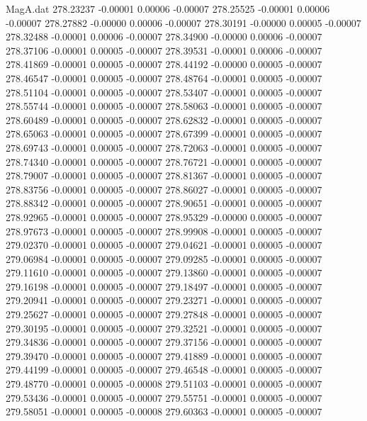 \begin{filecontents}{MagA.dat}
 278.23237   -0.00001    0.00006   -0.00007
 278.25525   -0.00001    0.00006   -0.00007
 278.27882   -0.00000    0.00006   -0.00007
 278.30191   -0.00000    0.00005   -0.00007
 278.32488   -0.00001    0.00006   -0.00007
 278.34900   -0.00000    0.00006   -0.00007
 278.37106   -0.00001    0.00005   -0.00007
 278.39531   -0.00001    0.00006   -0.00007
 278.41869   -0.00001    0.00005   -0.00007
 278.44192   -0.00000    0.00005   -0.00007
 278.46547   -0.00001    0.00005   -0.00007
 278.48764   -0.00001    0.00005   -0.00007
 278.51104   -0.00001    0.00005   -0.00007
 278.53407   -0.00001    0.00005   -0.00007
 278.55744   -0.00001    0.00005   -0.00007
 278.58063   -0.00001    0.00005   -0.00007
 278.60489   -0.00001    0.00005   -0.00007
 278.62832   -0.00001    0.00005   -0.00007
 278.65063   -0.00001    0.00005   -0.00007
 278.67399   -0.00001    0.00005   -0.00007
 278.69743   -0.00001    0.00005   -0.00007
 278.72063   -0.00001    0.00005   -0.00007
 278.74340   -0.00001    0.00005   -0.00007
 278.76721   -0.00001    0.00005   -0.00007
 278.79007   -0.00001    0.00005   -0.00007
 278.81367   -0.00001    0.00005   -0.00007
 278.83756   -0.00001    0.00005   -0.00007
 278.86027   -0.00001    0.00005   -0.00007
 278.88342   -0.00001    0.00005   -0.00007
 278.90651   -0.00001    0.00005   -0.00007
 278.92965   -0.00001    0.00005   -0.00007
 278.95329   -0.00000    0.00005   -0.00007
 278.97673   -0.00001    0.00005   -0.00007
 278.99908   -0.00001    0.00005   -0.00007
 279.02370   -0.00001    0.00005   -0.00007
 279.04621   -0.00001    0.00005   -0.00007
 279.06984   -0.00001    0.00005   -0.00007
 279.09285   -0.00001    0.00005   -0.00007
 279.11610   -0.00001    0.00005   -0.00007
 279.13860   -0.00001    0.00005   -0.00007
 279.16198   -0.00001    0.00005   -0.00007
 279.18497   -0.00001    0.00005   -0.00007
 279.20941   -0.00001    0.00005   -0.00007
 279.23271   -0.00001    0.00005   -0.00007
 279.25627   -0.00001    0.00005   -0.00007
 279.27848   -0.00001    0.00005   -0.00007
 279.30195   -0.00001    0.00005   -0.00007
 279.32521   -0.00001    0.00005   -0.00007
 279.34836   -0.00001    0.00005   -0.00007
 279.37156   -0.00001    0.00005   -0.00007
 279.39470   -0.00001    0.00005   -0.00007
 279.41889   -0.00001    0.00005   -0.00007
 279.44199   -0.00001    0.00005   -0.00007
 279.46548   -0.00001    0.00005   -0.00007
 279.48770   -0.00001    0.00005   -0.00008
 279.51103   -0.00001    0.00005   -0.00007
 279.53436   -0.00001    0.00005   -0.00007
 279.55751   -0.00001    0.00005   -0.00007
 279.58051   -0.00001    0.00005   -0.00008
 279.60363   -0.00001    0.00005   -0.00007

\end{filecontents}
